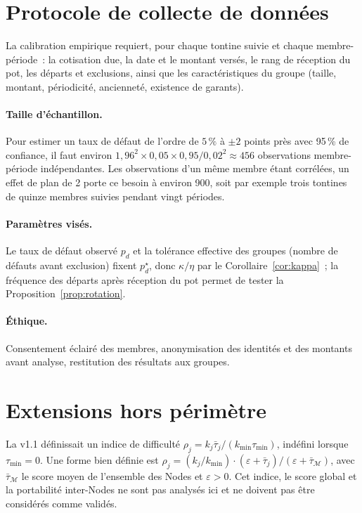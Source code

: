 \documentclass[11pt,a4paper]{article}
\theoremstyle{plain}
\theoremstyle{definition}
\theoremstyle{remark}
\newcommand{\1}{\mathbf{1}}
\begin{document}
\section{Protocole de collecte de données}
\label{app:collecte}

La calibration empirique requiert, pour chaque tontine suivie et chaque
membre-période~: la cotisation due, la date et le montant versés, le rang de
réception du pot, les départs et exclusions, ainsi que les caractéristiques du
groupe (taille, montant, périodicité, ancienneté, existence de garants).

\paragraph{Taille d'échantillon.} Pour estimer un taux de défaut de l'ordre de
$5\,\%$ à $\pm2$ points près avec 95\,\% de confiance, il faut environ
$1{,}96^2\times0{,}05\times0{,}95/0{,}02^2\approx456$ observations
membre-période indépendantes. Les observations d'un même membre étant
corrélées, un effet de plan de 2 porte ce besoin à environ 900, soit par
exemple trois tontines de quinze membres suivies pendant vingt périodes.

\paragraph{Paramètres visés.} Le taux de défaut observé $p_d$ et la tolérance
effective des groupes (nombre de défauts avant exclusion) fixent $p^\star_d$,
donc $\kappa/\eta$ par le Corollaire~\ref{cor:kappa}~; la fréquence des départs
après réception du pot permet de tester la Proposition~\ref{prop:rotation}.

\paragraph{Éthique.} Consentement éclairé des membres, anonymisation des
identités et des montants avant analyse, restitution des résultats aux groupes.

\section{Extensions hors périmètre}
\label{app:extensions}

La v1.1 définissait un indice de difficulté
$\rho_j=k_j\bar\tau_j/(k_{\min}\tau_{\min})$, indéfini lorsque $\tau_{\min}=0$.
Une forme bien définie est
$\rho_j=(k_j/k_{\min})\cdot(\varepsilon+\bar\tau_j)/(\varepsilon+\bar\tau_{\mathcal M})$,
avec $\bar\tau_{\mathcal M}$ le score moyen de l'ensemble des Nodes et
$\varepsilon>0$. Cet indice, le score global et la portabilité inter-Nodes ne
sont pas analysés ici et ne doivent pas être considérés comme validés.
\end{document}

